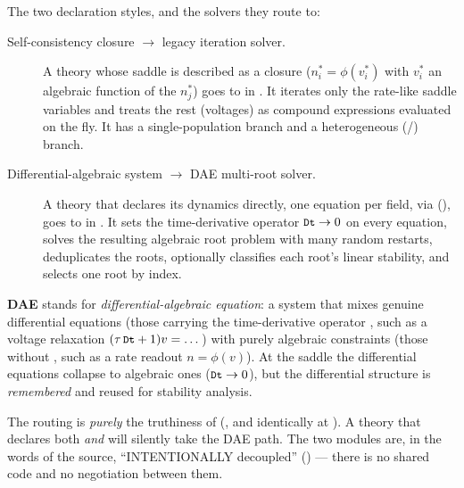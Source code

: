 The two declaration styles, and the solvers they route to:

\begin{description}
  \item[Self-consistency closure $\to$ legacy iteration solver.] A theory whose
        saddle is described as a closure ($n^{*}_i = \phi(v^{*}_i)$ with $v^{*}_i$
        an algebraic function of the $n^{*}_j$) goes to
         in . It iterates only the
        rate-like saddle variables and treats the rest (voltages) as compound
        expressions evaluated on the fly. It has a single-population branch and a
        heterogeneous (/) branch.
  \item[Differential-algebraic system $\to$ DAE multi-root solver.] A theory that
        declares its dynamics directly, one equation per field, via
        (), goes to
         in . It
        sets the time-derivative operator $\texttt{\small Dt}\to 0$ on every equation,
        solves the resulting algebraic root problem with many random restarts,
        deduplicates the roots, optionally classifies each root's linear
        stability, and selects one root by index.
\end{description}

\begin{defn}
\textbf{DAE} stands for \emph{differential-algebraic equation}: a system that
mixes genuine differential equations (those carrying the time-derivative operator
, such as a voltage relaxation $(\tau\,\texttt{\small Dt}+1)v=\dots$) with purely
algebraic constraints (those without , such as a rate readout
$n=\phi(v)$). At the saddle the differential equations collapse to algebraic ones
($\texttt{\small Dt}\to 0$), but the differential structure is \emph{remembered} and
reused for stability analysis.
\end{defn}

\begin{gotcha}
The routing is \emph{purely} the truthiness of 
(, and identically at ). A theory
that declares both  \emph{and}  will
silently take the DAE path. The two modules are, in the words of the source,
``INTENTIONALLY decoupled'' () --- there is no
shared code and no negotiation between them.
\end{gotcha}

